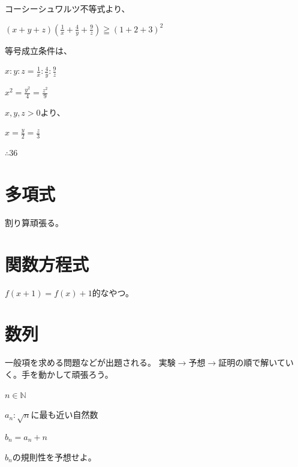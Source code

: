 \documentclass[uplatex,dvipdfmx]{jsbook}
\begin{document}
\begin{answer}
    コーシーシュワルツ不等式より、

    $\displaystyle \left(x+y+z\right)\left(\frac{1}{x}+\frac{4}{y}+\frac{9}{z}\right)\geqq \left(1+2+3\right)^2$

    等号成立条件は、

    $\displaystyle x:y:z=\frac{1}{x}:\frac{4}{y}:\frac{9}{z}$

    $x^2=\frac{y^2}{4}=\frac{z^2}{9}$

    $x,y,z>0$より、

    $x=\frac{y}{2}=\frac{z}{3}$

    $\therefore 36$
\end{answer}

\section{多項式}
割り算頑張る。

\section{関数方程式}
$f\left(x+1\right)=f\left(x\right)+1$的なやつ。

\section{数列}
一般項を求める問題などが出題される。
実験$\rightarrow$予想$\rightarrow$証明の順で解いていく。手を動かして頑張ろう。

\begin{problem}[練習問題1]
    $n\in \mathbb{N}$

    $a_n:\sqrt{n}$に最も近い自然数

    $b_n=a_n+n$

    $b_n$の規則性を予想せよ。
\end{problem}
\end{document}
